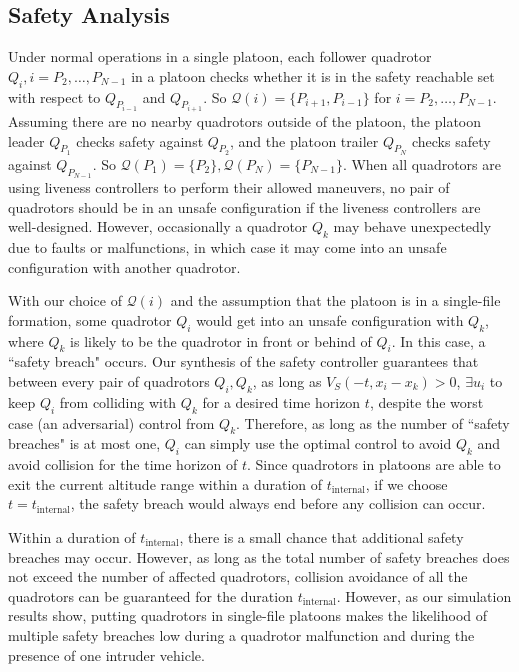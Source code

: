\subsection{Safety Analysis}
Under normal operations in a single platoon, each follower quadrotor $Q_i,i=P_2,\ldots,P_{N-1}$ in a platoon checks whether it is in the safety reachable set with respect to $Q_{P_{i-1}}$ and $Q_{P_{i+1}}$. So $\mathcal{Q}(i) = \{P_{i+1}, P_{i-1}\}$ for $i=P_2,\ldots,P_{N-1}$. Assuming there are no nearby quadrotors outside of the platoon, the platoon leader $Q_{P_1}$ checks safety against $Q_{P_2}$, and the platoon trailer $Q_{P_N}$ checks safety against $Q_{P_{N-1}}$. So $\mathcal{Q}(P_1)=\{P_2\}, \mathcal{Q}(P_N)=\{P_{N-1}\}$. When all quadrotors are using liveness controllers to perform their allowed maneuvers, no pair of quadrotors should be in an unsafe configuration if the liveness controllers are well-designed. However, occasionally a quadrotor $Q_k$ may behave unexpectedly due to faults or malfunctions, in which case it may come into an unsafe configuration with another quadrotor.

With our choice of $\mathcal{Q}(i)$ and the assumption that the platoon is in a single-file formation, some quadrotor $Q_i$ would get into an unsafe configuration with $Q_k$, where $Q_k$ is likely to be the quadrotor in front or behind of $Q_i$. In this case, a ``safety breach" occurs. Our synthesis of the safety controller guarantees that between every pair of quadrotors $Q_i,Q_k$, as long as $V_S(-t,x_i- x_k)>0$, $\exists u_i$ to keep $Q_i$ from colliding with $Q_k$ for a desired time horizon $t$, despite the worst case (an adversarial) control from $Q_k$. Therefore, as long as the number of ``safety breaches" is at most one, $Q_i$ can simply use the optimal control to avoid $Q_k$ and avoid collision for the time horizon of $t$. Since quadrotors in platoons are able to exit the current altitude range within a duration of $t_\text{internal}$, if we choose $t=t_\text{internal}$, the safety breach would always end before any collision can occur. 

Within a duration of $t_\text{internal}$, there is a small chance that additional safety breaches may occur. However, as long as the total number of safety breaches does not exceed the number of affected quadrotors, collision avoidance of all the quadrotors can be guaranteed for the duration $t_\text{internal}$. However, as our simulation results show, putting quadrotors in single-file platoons makes the likelihood of multiple safety breaches low during a quadrotor malfunction and during the presence of one intruder vehicle. 

